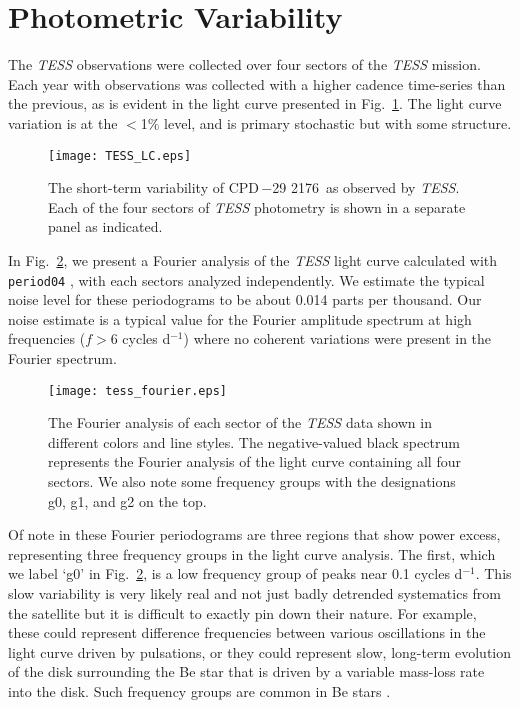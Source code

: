 \documentclass[]{aastex631}
\newcommand{\target}{CPD\,$-$29 2176}
\begin{document}
\section{Photometric Variability}

The \textit{TESS} observations were collected over four sectors of the \textit{TESS} mission. Each year with observations was collected with a higher cadence time-series than the previous, as is evident in the light curve presented in Fig.~\ref{fig:tessLC}. The light curve variation is at the $<$1$\%$ level, and is primary stochastic but with some structure.%

\begin{figure}
    \centering
    \texttt{[image: TESS\_LC.eps]}
    \caption{The short-term variability of \target\ as observed by \textit{TESS}. Each of the four sectors of \textit{TESS} photometry is shown in a separate panel as indicated.}
    \label{fig:tessLC}
\end{figure}

In Fig.~\ref{fig:tessFT}, we present a Fourier analysis of the \textit{TESS} light curve calculated with {\tt period04} \citep{2005CoAst.146...53L}, with each sectors analyzed independently. We estimate the typical noise level for these periodograms to be about 0.014 parts per thousand. Our noise estimate is a typical value for the Fourier amplitude spectrum at high frequencies ($f > 6$ cycles d$^{-1}$) where no coherent variations were present in the Fourier spectrum.

\begin{figure}
    \centering
    \texttt{[image: tess\_fourier.eps]}
    \caption{The Fourier analysis of each sector of the \textit{TESS} data shown in different colors and line styles. The negative-valued black spectrum represents the Fourier analysis of the light curve containing all four sectors. We also note some frequency groups with the designations g0, g1, and g2 on the top.}
        \label{fig:tessFT}
\end{figure}

Of note in these Fourier periodograms are three regions that show power excess, representing three frequency groups in the light curve analysis. The first, which we label `g0' in Fig.~\ref{fig:tessFT}, is a low frequency group of peaks near 0.1 cycles d$^{-1}$. This slow variability is very likely real and not just badly detrended systematics from the satellite but it is difficult to exactly pin down their nature. For example, these could represent difference frequencies between various oscillations in the light curve driven by pulsations, or they could represent slow, long-term evolution of the disk surrounding the Be star that is driven by a variable mass-loss rate into the disk. Such frequency groups are common in Be stars \citep[e.g., ][]{2022AJ....163..226L, 2018A&A...613A..70S, 2016A&A...588A..56B}.
\end{document}

